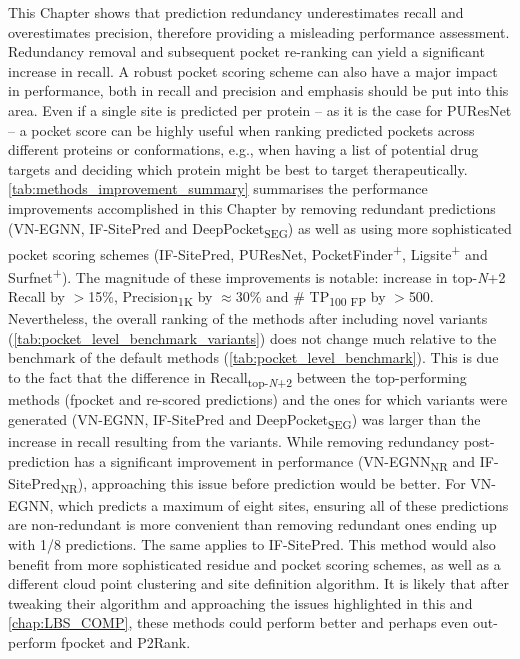 This Chapter shows that prediction redundancy underestimates recall and overestimates precision, therefore providing a misleading performance assessment. Redundancy removal and subsequent pocket re-ranking can yield a significant increase in recall. A robust pocket scoring scheme can also have a major impact in performance, both in recall and precision and emphasis should be put into this area. Even if a single site is predicted per protein -- as it is the case for PUResNet -- a pocket score can be highly useful when ranking predicted pockets across different proteins or conformations, e.g., when having a list of potential drug targets and deciding which protein might be best to target therapeutically. \autoref{tab:methods_improvement_summary} summarises the performance improvements accomplished in this Chapter by removing redundant predictions (VN-EGNN, IF-SitePred and DeepPocket\textsubscript{SEG}) as well as using more sophisticated pocket scoring schemes (IF-SitePred, PUResNet, PocketFinder\textsuperscript{+}, Ligsite\textsuperscript{+} and Surfnet\textsuperscript{+}). The magnitude of these improvements is notable: increase in top-\textit{N}+2 Recall by $>$15\%, Precision\textsubscript{1K} by $\approx$30\% and \# TP\textsubscript{100 FP} by $>$500. Nevertheless, the overall ranking of the methods after including novel variants (\autoref{tab:pocket_level_benchmark_variants}) does not change much relative to the benchmark of the default methods (\autoref{tab:pocket_level_benchmark}). This is due to the fact that the difference in Recall\textsubscript{top-\textit{N}+2} between the top-performing methods (fpocket and re-scored predictions) and the ones for which variants were generated (VN-EGNN, IF-SitePred and DeepPocket\textsubscript{SEG}) was larger than the increase in recall resulting from the variants. While removing redundancy post-prediction has a significant improvement in performance (VN-EGNN\textsubscript{NR} and IF-SitePred\textsubscript{NR}), approaching this issue before prediction would be better. For VN-EGNN, which predicts a maximum of eight sites, ensuring all of these predictions are non-redundant is more convenient than removing redundant ones ending up with 1/8 predictions. The same applies to IF-SitePred. This method would also benefit from more sophisticated residue and pocket scoring schemes, as well as a different cloud point clustering and site definition algorithm. It is likely that after tweaking their algorithm and approaching the issues highlighted in this and \autoref{chap:LBS_COMP}, these methods could perform better and perhaps even out-perform fpocket and P2Rank.

